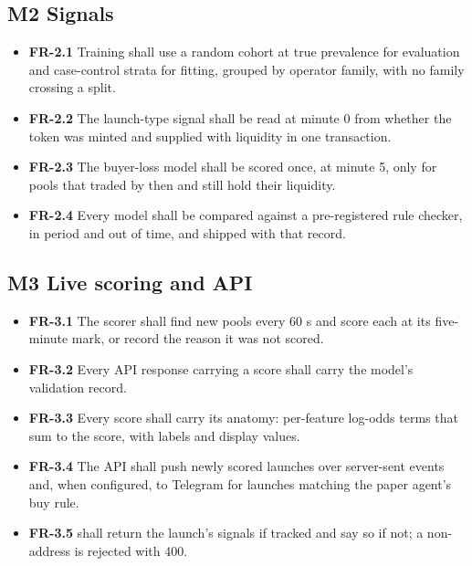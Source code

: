 \subsection{M2 Signals}
\begin{itemize}[label={}]
  \item \textbf{FR-2.1} Training shall use a random cohort at true prevalence for evaluation and case-control strata for fitting, grouped by operator family, with no family crossing a split.
  \item \textbf{FR-2.2} The launch-type signal shall be read at minute 0 from whether the token was minted and supplied with liquidity in one transaction.
  \item \textbf{FR-2.3} The buyer-loss model shall be scored once, at minute 5, only for pools that traded by then and still hold their liquidity.
  \item \textbf{FR-2.4} Every model shall be compared against a pre-registered rule checker, in period and out of time, and shipped with that record.
\end{itemize}
\subsection{M3 Live scoring and API}
\begin{itemize}[label={}]
  \item \textbf{FR-3.1} The scorer shall find new pools every 60 s and score each at its five-minute mark, or record the reason it was not scored.
  \item \textbf{FR-3.2} Every API response carrying a score shall carry the model's validation record.
  \item \textbf{FR-3.3} Every score shall carry its anatomy: per-feature log-odds terms that sum to the score, with labels and display values.
  \item \textbf{FR-3.4} The API shall push newly scored launches over server-sent events and, when configured, to Telegram for launches matching the paper agent's buy rule.
  \item \textbf{FR-3.5}  shall return the launch's signals if tracked and say so if not; a non-address is rejected with 400.
\end{itemize}
